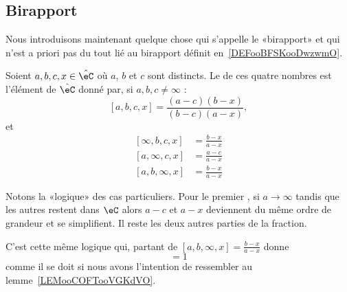 \subsection{Birapport}

Nous introduisons maintenant quelque chose qui s'appelle le «birapport» et qui n'est a priori pas du tout lié au birapport définit en~\ref{DEFooBFSKooDwzwmO}.

\begin{definition}        \label{DEFooQYHVooMZwQMB}
    Soient \( a,b,c,x\in \hat\eC\) où \( a\), \( b\) et \( c\) sont distincts. Le  de ces quatre nombres est l'élément de \( \hat\eC\) donné par, si \( a,b,c\neq \infty\) :
    \begin{equation}        \label{EQooQJWZooOXKslh}
        [a,b,c,x]=\frac{ (a-c)(b-x) }{ (b-c)(a-x) },
    \end{equation}
    et
    \begin{subequations}
        \begin{align}
            [\infty,b,c,x]&=\frac{ b-x }{ a-x }\\
            [a,\infty,c,x]&=\frac{a-c}{a-x}\\
            [a,b,\infty,x]&=\frac{ b-x }{ a-x }
        \end{align}
    \end{subequations}
\end{definition}

\begin{normaltext}
    Notons la «logique» des cas particuliers. Pour le premier%
    , si \( a\to\infty\) tandis que les autres restent dans \( \eC\) alors \( a-c\) et \( a-x\) deviennent du même ordre de grandeur et se simplifient. Il reste les deux autres parties de la fraction.

    C'est cette même logique qui, partant de \( [a,b,\infty,x]=\frac{ b-x }{ a-x }\) donne
    \begin{equation}
        [a,b,\infty,\infty]=1
    \end{equation}
    comme il se doit si nous avons l'intention de ressembler au lemme~\ref{LEMooCOFTooVGKdVO}.
\end{normaltext}

